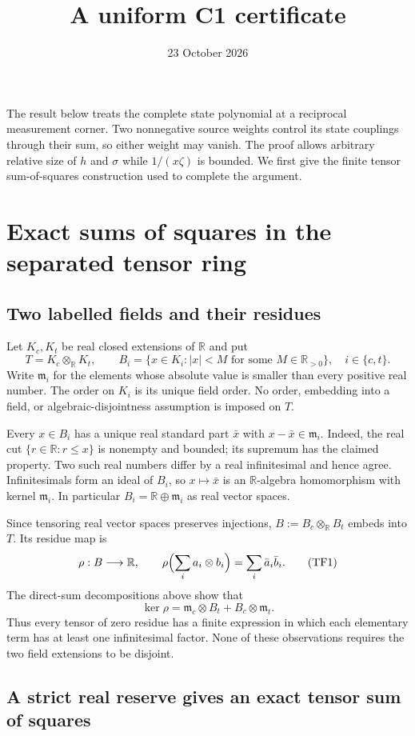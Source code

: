 \documentclass[10pt,a4paper]{article}
\title{A uniform C1 certificate}
\author{}
\date{23 October 2026}
\begin{document}
\maketitle
The result below treats the complete state polynomial at a reciprocal
measurement corner. Two nonnegative source weights control its state
couplings through their sum, so either weight may vanish. The proof
allows arbitrary relative size of $h$ and $\sigma$ while $1/(x\zeta)$
is bounded. We first give the finite tensor sum-of-squares construction
used to complete the argument.
\section{Exact sums of squares in the separated tensor ring}
\label{ch:tensor}
\subsection{Two labelled fields and their residues}
Let $K_c,K_t$ be real closed extensions of $\mathbb R$ and put
\[
 T=K_c\otimes_{\mathbb R}K_t,\qquad
 B_i=\{x\in K_i: |x|<M\text{ for some }M\in\mathbb R_{>0}\},
 \quad i\in\{c,t\}.
\]
Write $\mathfrak m_i$ for the elements whose absolute value is smaller
than every positive real number. The order on $K_i$ is its unique field
order. No order, embedding into a field, or algebraic-disjointness
assumption is imposed on $T$.

Every $x\in B_i$ has a unique real standard part $\bar x$ with
$x-\bar x\in\mathfrak m_i$. Indeed, the real cut
$\{r\in\mathbb R:r\le x\}$ is nonempty and bounded; its supremum
has the claimed property. Two such real numbers differ by a real
infinitesimal and hence agree. Infinitesimals form an ideal of $B_i$,
so $x\mapsto\bar x$ is an $\mathbb R$-algebra homomorphism with
kernel $\mathfrak m_i$. In particular
$B_i=\mathbb R\oplus\mathfrak m_i$ as real vector spaces.

Since tensoring real vector spaces preserves injections,
$B:=B_c\otimes_{\mathbb R}B_t$ embeds into $T$. Its residue map is
\[
 \rho:B\longrightarrow\mathbb R,\qquad
 \rho\Bigl(\sum_i a_i\otimes b_i\Bigr)=\sum_i\bar a_i\bar b_i.
 \tag{TF1}
\]
The direct-sum decompositions above show that
\[
 \ker\rho=\mathfrak m_c\otimes B_t+B_c\otimes\mathfrak m_t.
 \tag{TF2}
\]
Thus every tensor of zero residue has a finite expression in which
each elementary term has at least one infinitesimal factor. None of
these observations requires the two field extensions to be disjoint.

\subsection{A strict real reserve gives an exact tensor sum of squares}
\label{component:p25af2c58da7e}
\label{p25af2c58da7e:sec:mechanism}
\label{p25af2c58da7e:lem:residue}
\end{document}

